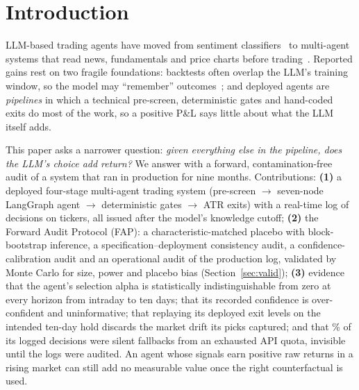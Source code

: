 \documentclass[conference]{IEEEtran}
\begin{document}
\section{Introduction}
LLM-based trading agents have moved from sentiment classifiers~\cite{lopezlira2023chatgpt,yang2023fingpt} to multi-agent systems that read news, fundamentals and price charts before trading~\cite{yu2023finmem,zhang2024finagent,xiao2024tradingagents,ding2024survey}. Reported gains rest on two fragile foundations: backtests often overlap the LLM's training window, so the model may ``remember'' outcomes~\cite{glasserman2023lookahead}; and deployed agents are \emph{pipelines} in which a technical pre-screen, deterministic gates and hand-coded exits do most of the work, so a positive P\&L says little about what the LLM itself adds.

This paper asks a narrower question: \emph{given everything else in the pipeline, does the LLM's choice add return?} We answer with a forward, contamination-free audit of a system that ran in production for nine months. Contributions: \textbf{(1)} a deployed four-stage multi-agent trading system (pre-screen $\rightarrow$ seven-node LangGraph agent $\rightarrow$ deterministic gates $\rightarrow$ ATR exits) with a real-time log of \nRaw{} decisions on \nLogTick{} tickers, all issued after the model's knowledge cutoff; \textbf{(2)} the Forward Audit Protocol (FAP): a characteristic-matched placebo with block-bootstrap inference, a specification--deployment consistency audit, a confidence-calibration audit and an operational audit of the production log, validated by Monte Carlo for size, power and placebo bias (Section~\ref{sec:valid}); \textbf{(3)} evidence that the agent's selection alpha is statistically indistinguishable from zero at every horizon from intraday to ten days; that its recorded confidence is over-confident and uninformative; that replaying its deployed exit levels on the intended ten-day hold discards the market drift its picks captured; and that \opFallbackPct\% of its logged decisions were silent fallbacks from an exhausted API quota, invisible until the logs were audited. An agent whose signals earn positive raw returns in a rising market can still add no measurable value once the right counterfactual is used.

\end{document}
